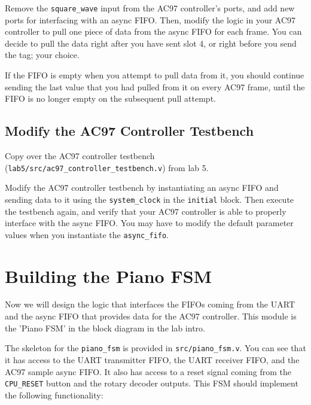 \documentclass[11pt]{article}
\begin{document}
Remove the \verb|square_wave| input from the AC97 controller's ports, and add new ports for interfacing with an async FIFO. Then, modify the logic in your AC97 controller to pull one piece of data from the async FIFO for each frame. You can decide to pull the data right after you have sent slot 4, or right before you send the tag; your choice.

If the FIFO is empty when you attempt to pull data from it, you should continue sending the last value that you had pulled from it on every AC97 frame, until the FIFO is no longer empty on the subsequent pull attempt.

\subsection{Modify the AC97 Controller Testbench}
Copy over the AC97 controller testbench (\verb|lab5/src/ac97_controller_testbench.v|) from lab 5.

Modify the AC97 controller testbench by instantiating an async FIFO and sending data to it using the \verb|system_clock| in the \verb|initial| block. Then execute the testbench again, and verify that your AC97 controller is able to properly interface with the async FIFO. You may have to modify the default parameter values when you instantiate the \verb|async_fifo|.

\section{Building the Piano FSM}
Now we will design the logic that interfaces the FIFOs coming from the UART and the async FIFO that provides data for the AC97 controller. This module is the 'Piano FSM' in the block diagram in the lab intro.

The skeleton for the \verb|piano_fsm| is provided in \verb|src/piano_fsm.v|. You can see that it has access to the UART transmitter FIFO, the UART receiver FIFO, and the AC97 sample async FIFO. It also has access to a reset signal coming from the \verb|CPU_RESET| button and the rotary decoder outputs. This FSM should implement the following functionality:
\end{document}
